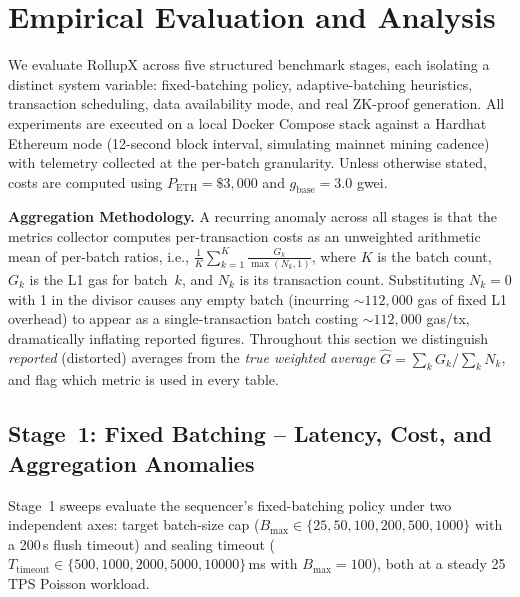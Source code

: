 
\section{Empirical Evaluation and Analysis}
\label{sec:results}

We evaluate RollupX across five structured benchmark stages, each isolating a distinct
system variable: fixed-batching policy, adaptive-batching heuristics, transaction
scheduling, data availability mode, and real ZK-proof generation.
All experiments are executed on a local Docker Compose stack against a Hardhat
Ethereum node (12-second block interval, simulating mainnet mining cadence) with
telemetry collected at the per-batch granularity.
Unless otherwise stated, costs are computed using $P_\mathrm{ETH}=\$3{,}000$ and
$g_\mathrm{base}=3.0$ gwei.

\vspace{0.4em}
\noindent\textbf{Aggregation Methodology.}
A recurring anomaly across all stages is that the metrics collector computes
per-transaction costs as an unweighted arithmetic mean of per-batch ratios,
i.e., $\frac{1}{K}\sum_{k=1}^{K}\frac{G_k}{\max(N_k,1)}$, where $K$ is the
batch count, $G_k$ is the L1 gas for batch~$k$, and $N_k$ is its transaction
count.  Substituting $N_k=0$ with 1 in the divisor causes any empty batch
(incurring ${\sim}112{,}000$ gas of fixed L1 overhead) to appear as a
single-transaction batch costing ${\sim}112{,}000$ gas/tx, dramatically inflating
reported figures.  Throughout this section we distinguish \emph{reported} (distorted)
averages from the \emph{true weighted average}
$\hat{G}=\sum_k G_k / \sum_k N_k$, and flag which metric is used in every table.

\subsection{Stage~1: Fixed Batching -- Latency, Cost, and Aggregation Anomalies}
\label{sec:stage1}

Stage~1 sweeps evaluate the sequencer's fixed-batching policy under two
independent axes: target batch-size cap ($B_{\max}\in\{25,50,100,200,500,1000\}$
with a 200\,s flush timeout) and sealing timeout
($T_{\mathrm{timeout}}\in\{500,1000,2000,5000,10000\}$\,ms with $B_{\max}=100$),
both at a steady 25\,TPS Poisson workload.

